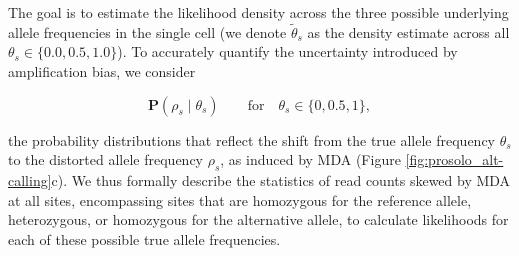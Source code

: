 \documentclass[12pt,inline]{wlscirep}
\begin{document}
The goal is to estimate the likelihood density across the three possible underlying allele frequencies in the single cell (we denote $\tilde{\theta}_s$ as the density estimate across all $\theta_s\in\{0.0,0.5,1.0\}$).
To accurately quantify the uncertainty introduced by amplification bias, we consider  

\begin{equation}
 \mathbf{P}(\rho_s\mid\theta_s)\qquad \text{for}  \quad\theta_s\in\{0,0.5,1\},
\end{equation}

the probability distributions that reflect the shift from the true allele frequency $\theta_s$ to the distorted allele frequency $\rho_s$, as induced by MDA (Figure \ref{fig:prosolo_alt-calling}c).
We thus formally describe the statistics of read counts skewed by MDA at all sites, encompassing sites that are homozygous for the reference allele, heterozygous, or homozygous for the alternative allele, to calculate likelihoods for each of these possible true allele frequencies.
\end{document}
